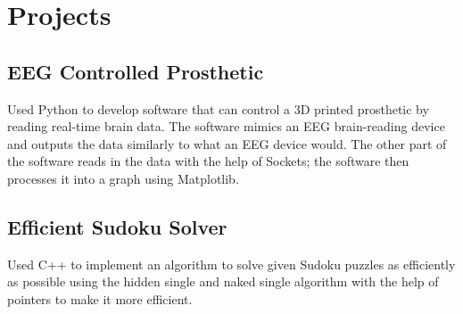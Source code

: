 \documentclass{article}
\begin{document}
\noindent
\begin{minipage}[t]{0.48\textwidth}
    \section{Projects}
    \subsection{EEG Controlled Prosthetic}
    \vspace{-0.5em} %
    \normalsize{Used Python to develop software that can control a 3D printed
    prosthetic by reading real-time brain data. The software mimics
    an EEG brain-reading device and outputs the data similarly to
    what an EEG device would. The other part of the software reads
    in the data with the help of Sockets; the software then processes
    it into a graph using Matplotlib.}
    \vspace{0.5em} %

    \subsection{Efficient Sudoku Solver}
    \vspace{-0.5em} %
    \normalsize{Used C++ to implement an algorithm to solve given Sudoku puzzles as efficiently as possible using the hidden single and naked
    single algorithm with the help of pointers to make it more efficient.}
    \vspace{0.5em} %


\end{minipage}
\hfill
\end{document}
